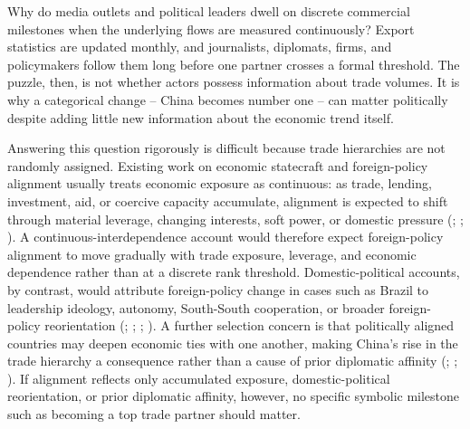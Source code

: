 \documentclass[
  12pt,
]{article}
\begin{document}
Why do media outlets and political leaders dwell on discrete commercial milestones when the underlying flows are measured continuously? Export statistics are updated monthly, and journalists, diplomats, firms, and policymakers follow them long before one partner crosses a formal threshold. The puzzle, then, is not whether actors possess information about trade volumes. It is why a categorical change -- China becomes number one -- can matter politically despite adding little new information about the economic trend itself.

Answering this question rigorously is difficult because trade hierarchies are not randomly assigned. Existing work on economic statecraft and foreign-policy alignment usually treats economic exposure as continuous: as trade, lending, investment, aid, or coercive capacity accumulate, alignment is expected to shift through material leverage, changing interests, soft power, or domestic pressure (; ; ). A continuous-interdependence account would therefore expect foreign-policy alignment to move gradually with trade exposure, leverage, and economic dependence rather than at a discrete rank threshold. Domestic-political accounts, by contrast, would attribute foreign-policy change in cases such as Brazil to leadership ideology, autonomy, South-South cooperation, or broader foreign-policy reorientation (; ; ; ). A further selection concern is that politically aligned countries may deepen economic ties with one another, making China's rise in the trade hierarchy a consequence rather than a cause of prior diplomatic affinity (; ; ). If alignment reflects only accumulated exposure, domestic-political reorientation, or prior diplomatic affinity, however, no specific symbolic milestone such as becoming a top trade partner should matter.
\end{document}
